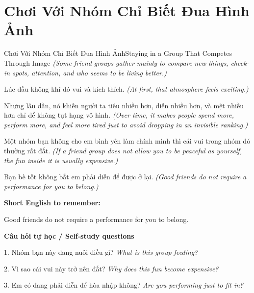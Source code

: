 \section{Chơi Với Nhóm Chỉ Biết Đua Hình Ảnh}
\begin{truyen}{Chơi Với Nhóm Chỉ Biết Đua Hình Ảnh}{Staying in a Group That Competes Through Image}
\textit{(Some friend groups gather mainly to compare new things, check-in spots, attention, and who seems to be living better.)}

Lúc đầu không khí đó vui và kích thích.
\textit{(At first, that atmosphere feels exciting.)}

Nhưng lâu dần, nó khiến người ta tiêu nhiều hơn, diễn nhiều hơn, và mệt nhiều hơn chỉ để không tụt hạng vô hình.
\textit{(Over time, it makes people spend more, perform more, and feel more tired just to avoid dropping in an invisible ranking.)}

Một nhóm bạn không cho em bình yên làm chính mình thì cái vui trong nhóm đó thường rất đắt.
\textit{(If a friend group does not allow you to be peaceful as yourself, the fun inside it is usually expensive.)}

\end{truyen}

\begin{baihoc}
Bạn bè tốt không bắt em phải diễn để được ở lại.
\textit{(Good friends do not require a performance for you to belong.)}
\end{baihoc}

\begin{ghinhoanh}
\textbf{Short English to remember:}

Good friends do not require a performance for you to belong.

\end{ghinhoanh}

\begin{tuhocnhanh}
\textbf{Câu hỏi tự học / Self-study questions}

1. Nhóm bạn này đang nuôi điều gì? \textit{What is this group feeding?}

2. Vì sao cái vui này trở nên đắt? \textit{Why does this fun become expensive?}

3. Em có đang phải diễn để hòa nhập không? \textit{Are you performing just to fit in?}
\end{tuhocnhanh}
\ngancach

